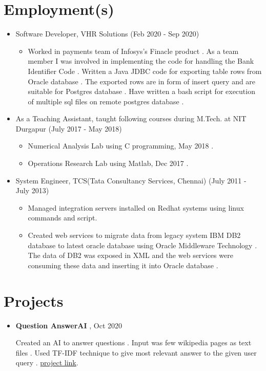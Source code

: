 \documentclass[a4paper,10pt]{article}
\begin{document}
	\section{Employment(s)}
	\begin{itemize}
	        \item Software Developer, VHR Solutions (Feb 2020 - Sep 2020)
                \begin{itemize}
                    \item Worked in payments team of Infosys’s Finacle product . As a team member I was involved in implementing the code for handling the Bank Identifier Code . Written a Java JDBC code for exporting table rows from Oracle database . The exported rows are in form of insert query and are suitable for Postgres database . Have written a bash script for execution of multiple sql files on remote postgres database .
                \end{itemize}
			\item As  a Teaching Assistant, taught following courses during M.Tech. at NIT Durgapur (July 2017 - May 2018)
                \begin{itemize}
                    \item Numerical Analysis Lab using C programming, May 2018 .
                    \item Operations Research Lab using Matlab, Dec 2017 .
                \end{itemize}
            \item System Engineer, TCS(Tata Consultancy Services, Chennai) (July 2011 - July 2013)
		        \begin{itemize}
			    	\item Managed integration servers installed on Redhat systems using linux commands and script.
					\item Created web services to migrate data from legacy system IBM DB2 database to latest oracle database using Oracle Middleware Technology .
					The data  of DB2 was exposed in XML  and the web services were consuming these data and inserting it into Oracle database .
			\end{itemize}
	\end{itemize}

	\section{Projects}
	
	\begin{itemize}
		\item \textbf{Question AnswerAI} , Oct 2020 
		
		Created an AI to answer questions . Input was few wikipedia pages as text files . Used TF-IDF technique to give most relevant answer to the given user query .
		\href{https://github.com/eelectron/questions}{project link}.  
	\end{itemize}
	
\end{document}

